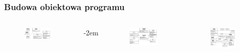 \documentclass[aspectratio=169]{beamer}
\begin{document}
\begin{frame}
    \frametitle{Budowa obiektowa programu}

    \begin{columns}[c]

        \begin{figure}
            \includegraphics[width=0.95\textwidth]{img/uml/global-sturcture.png}
        \end{figure}
        \kern-2em
        \begin{figure}
            \includegraphics[width=0.95\textwidth]{img/uml/sokar-scene-sets.png}
        \end{figure}

        \begin{figure}
            \includegraphics[width=0.95\textwidth]{img/uml/dicom-view.png}
        \end{figure}

    \end{columns}

\end{frame}
\end{document}
